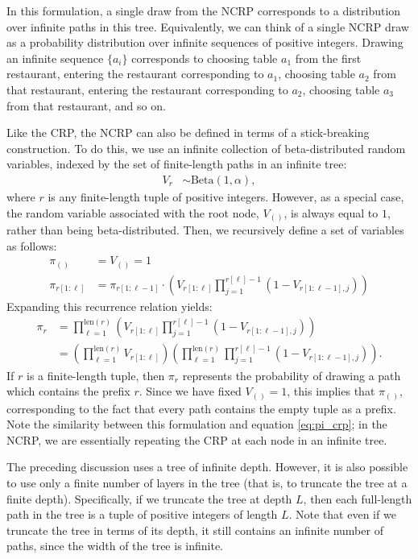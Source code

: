 \documentclass{article}
\newcommand{\len}{\mathrm{len}}
\begin{document}
In this formulation, a single draw from the NCRP corresponds to a distribution over infinite paths in this tree.
Equivalently, we can think of a single NCRP draw as a probability distribution over infinite sequences of positive integers.
Drawing an infinite sequence $\{a_i\}$ corresponds to choosing table $a_1$ from the first restaurant, entering the restaurant corresponding to $a_1$, choosing table $a_2$ from that restaurant, entering the restaurant corresponding to $a_2$, choosing table $a_3$ from that restaurant, and so on.

Like the CRP, the NCRP can also be defined in terms of a stick-breaking construction.
To do this, we use an infinite collection of beta-distributed random variables, indexed by the set of finite-length paths in an infinite tree:
\begin{align}
V_r &\sim \text{Beta}(1, \alpha),
\end{align}
where $r$ is any finite-length tuple of positive integers.
However, as a special case, the random variable associated with the root node, $V_{()}$, is always equal to $1$, rather than being beta-distributed.
Then, we recursively define a set of variables as follows:
\begin{align}
\pi_{()} &= V_{()} = 1 \\
\pi_{r[1:\ell]} &= \pi_{r[1:\ell-1]} \cdot \left( V_{r[1:\ell]} \prod_{j=1}^{r[\ell]-1} (1-V_{r[1:\ell-1],j}) \right)
\end{align}
Expanding this recurrence relation yields:
\begin{align}
\pi_r
&= \prod_{\ell = 1}^{\len(r)} \left( V_{r[1:\ell]} \prod_{j=1}^{r[\ell]-1} \left( 1 - V_{r[1:\ell-1],j} \right) \right) \\
&= \left( \prod_{\ell = 1}^{\len(r)} V_{r[1:\ell]} \right) \left( \prod_{\ell = 1}^{\len(r)} \prod_{j=1}^{r[\ell]-1} \left( 1 - V_{r[1:\ell-1],j} \right) \right).
\end{align}
If $r$ is a finite-length tuple, then $\pi_r$ represents the probability of drawing a path which contains the prefix $r$.
Since we have fixed $V_{()} = 1$, this implies that $\pi_{()}$, corresponding to the fact that every path contains the empty tuple as a prefix.
Note the similarity between this formulation and equation \eqref{eq:pi_crp}; in the NCRP, we are essentially repeating the CRP at each node in an infinite tree.

The preceding discussion uses a tree of infinite depth.
However, it is also possible to use only a finite number of layers in the tree (that is, to truncate the tree at a finite depth).
Specifically, if we truncate the tree at depth $L$, then each full-length path in the tree is a tuple of positive integers of length $L$.
Note that even if we truncate the tree in terms of its depth, it still contains an infinite number of paths, since the width of the tree is infinite.
\end{document}
